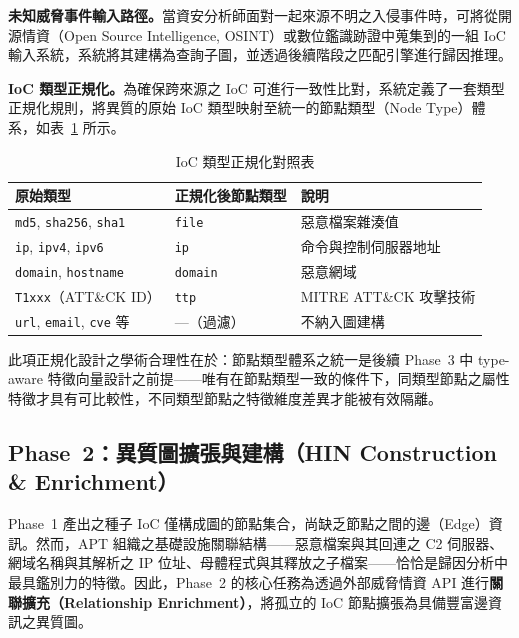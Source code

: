 \begin{ZhChapter}
\textbf{未知威脅事件輸入路徑。}當資安分析師面對一起來源不明之入侵事件時，可將從開源情資（Open Source Intelligence, OSINT）或數位鑑識跡證中蒐集到的一組 IoC 輸入系統，系統將其建構為查詢子圖，並透過後續階段之匹配引擎進行歸因推理。

\textbf{IoC 類型正規化。}為確保跨來源之 IoC 可進行一致性比對，系統定義了一套類型正規化規則，將異質的原始 IoC 類型映射至統一的節點類型（Node Type）體系，如表~\ref{tab:ioc-normalization} 所示。

\begin{table}[htbp]
    \centering
    \caption{IoC 類型正規化對照表}
    \label{tab:ioc-normalization}
    \renewcommand\arraystretch{1.2}
    \begin{tabular}{l l l}
        \hline
        \textbf{原始類型} & \textbf{正規化後節點類型} & \textbf{說明} \\
        \hline
        \texttt{md5}, \texttt{sha256}, \texttt{sha1} & \texttt{file} & 惡意檔案雜湊值 \\
        \texttt{ip}, \texttt{ipv4}, \texttt{ipv6} & \texttt{ip} & 命令與控制伺服器地址 \\
        \texttt{domain}, \texttt{hostname} & \texttt{domain} & 惡意網域 \\
        \texttt{T1xxx}（ATT\&CK ID） & \texttt{ttp} & MITRE ATT\&CK 攻擊技術 \\
        \texttt{url}, \texttt{email}, \texttt{cve} 等 & —（過濾） & 不納入圖建構 \\
        \hline
    \end{tabular}
\end{table}

此項正規化設計之學術合理性在於：節點類型體系之統一是後續 Phase~3 中 type-aware 特徵向量設計之前提——唯有在節點類型一致的條件下，同類型節點之屬性特徵才具有可比較性，不同類型節點之特徵維度差異才能被有效隔離。

\subsection{Phase~2：異質圖擴張與建構（HIN Construction \& Enrichment）}
\label{subsec:phase2}

Phase~1 產出之種子 IoC 僅構成圖的節點集合，尚缺乏節點之間的邊（Edge）資訊。然而，APT 組織之基礎設施關聯結構——惡意檔案與其回連之 C2 伺服器、網域名稱與其解析之 IP 位址、母體程式與其釋放之子檔案——恰恰是歸因分析中最具鑑別力的特徵。因此，Phase~2 的核心任務為透過外部威脅情資 API 進行\textbf{關聯擴充（Relationship Enrichment）}，將孤立的 IoC 節點擴張為具備豐富邊資訊之異質圖。


\end{ZhChapter}
